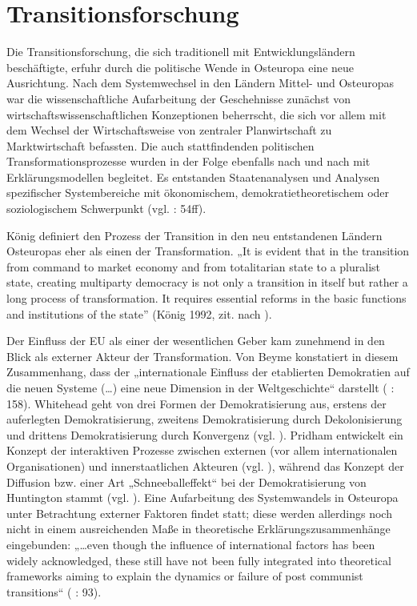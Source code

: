 \section{Transitionsforschung}
Die Transitionsforschung, die sich traditionell mit Entwicklungsländern beschäftigte, erfuhr durch die politische Wende in Osteuropa eine neue Ausrichtung. Nach dem Systemwechsel in den Ländern Mittel- und Osteuropas war die wissenschaftliche Aufarbeitung der Geschehnisse zunächst von wirtschaftswissenschaftlichen Konzeptionen beherrscht, die sich vor allem mit dem Wechsel der Wirtschaftsweise von zentraler Planwirtschaft zu Marktwirtschaft befassten. Die auch stattfindenden politischen Transformationsprozesse wurden in der Folge ebenfalls nach und nach mit Erklärungsmodellen begleitet. Es entstanden Staatenanalysen und Analysen spezifischer Systembereiche mit ökonomischem, demokratietheoretischem oder soziologischem Schwerpunkt (vgl. \cite{huszak} : 54ff).\par
König definiert den Prozess der Transition in den neu entstandenen Ländern Osteuropas eher als einen der Transformation. „It is evident that in the transition from command to market economy and from totalitarian state to a pluralist state, creating multiparty democracy is not only a transition in itself but rather a long process of transformation. It requires essential reforms in the basic functions and institutions of the state” (König 1992, zit. nach \cite{jenei}). \par
Der Einfluss der EU als einer der wesentlichen Geber kam zunehmend in den Blick als externer Akteur der Transformation. Von Beyme konstatiert in diesem Zusammenhang, dass der „internationale Einfluss der etablierten Demokratien auf die neuen Systeme (…) eine neue Dimension in der Weltgeschichte“ darstellt (\cite{beyme} : 158). Whitehead geht von drei Formen der Demokratisierung aus, erstens der auferlegten Demokratisierung, zweitens Demokratisierung durch Dekolonisierung und drittens Demokratisierung durch Konvergenz (vgl. \cite{whitehead}). Pridham entwickelt ein Konzept der interaktiven Prozesse zwischen externen (vor allem internationalen Organisationen) und innerstaatlichen Akteuren (vgl. \cite{pridham91,pridham95,pridham08}), während das Konzept der Diffusion bzw. einer Art „Schneeballeffekt“ bei der Demokratisierung von Huntington stammt (vgl. \cite{hunting}). Eine Aufarbeitung des Systemwandels in Osteuropa unter Betrachtung externer Faktoren findet statt; diese werden allerdings noch nicht in einem ausreichenden Maße in theoretische Erklärungszusammenhänge eingebunden: „…even though the influence of international factors has been widely acknowledged, these still have not been fully integrated into theoretical frameworks aiming to explain the dynamics or failure of post communist transitions“ (\cite{dimpri} : 93).\par
